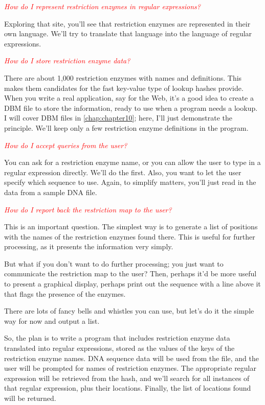 \textcolor{red}{\textit{How do I represent restriction enzymes in regular expressions?}}
\begin{adjustwidth}{2em}{}
Exploring that site, you'll see that restriction enzymes are represented in their own language. We'll try to translate that language into the language of regular expressions.
\end{adjustwidth}

\textcolor{red}{\textit{How do I store restriction enzyme data?}}
\begin{adjustwidth}{2em}{}
There are about 1,000 restriction enzymes with names and definitions. This makes them candidates for the fast key-value type of lookup hashes provide. When you write a real application, say for the Web, it's a good idea to create a DBM file to store the information, ready to use when a program needs a lookup. I will cover DBM files in \autoref{chap:chapter10}; here, I'll just demonstrate the principle. We'll keep only a few restriction enzyme definitions in the program.
\end{adjustwidth}

\textcolor{red}{\textit{How do I accept queries from the user?}}
\begin{adjustwidth}{2em}{}
You can ask for a restriction enzyme name, or you can allow the user to type in a regular expression directly. We'll do the first. Also, you want to let the user specify which sequence to use. Again, to simplify matters, you'll just read in the data from a sample DNA file. 
\end{adjustwidth}

\textcolor{red}{\textit{How do I report back the restriction map to the user?}}
\begin{adjustwidth}{2em}{}
This is an important question. The simplest way is to generate a list of positions with the names of the restriction enzymes found there. This is useful for further processing, as it presents the information very simply.

But what if you don't want to do further processing; you just want to communicate the restriction map to the user? Then, perhaps it'd be more useful to present a graphical display, perhaps print out the sequence with a line above it that flags the presence of the enzymes.

There are lots of fancy bells and whistles you can use, but let's do it the simple way for now and output a list.
\end{adjustwidth}

So, the plan is to write a program that includes restriction enzyme data translated into regular expressions, stored as the values of the keys of the restriction enzyme names. DNA sequence data will be used from the file, and the user will be prompted for names of restriction enzymes. The appropriate regular expression will be retrieved from the hash, and we'll search for all instances of that regular expression, plus their locations. Finally, the list of locations found will be returned. 

